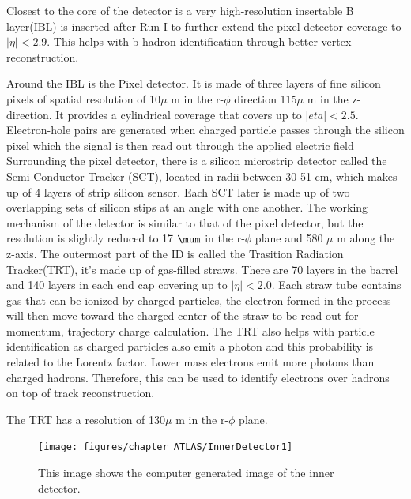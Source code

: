 Closest to the core of the detector is a very high-resolution insertable B layer(IBL) is inserted after Run I to further extend the pixel detector coverage to $|\eta|< 2.9$. This helps with b-hadron identification through better vertex reconstruction.

Around the IBL is the Pixel detector. It is made of three layers of fine silicon pixels of spatial resolution of 10$\mu$ m in the r-$\phi$ direction 115$\mu$ m in the z-direction. It provides a cylindrical coverage that covers up to $|eta|<2.5$. Electron-hole pairs are generated when charged particle passes through the silicon pixel which the signal is then read out through the applied electric field
Surrounding the pixel detector, there is a silicon microstrip detector called the Semi-Conductor Tracker (SCT), located in radii between 30-51 cm, which makes up of 4 layers of strip silicon sensor. Each SCT later is made up of two overlapping sets of silicon stips at an angle with one another. The working mechanism of the detector is similar to that of the pixel detector, but the resolution is slightly reduced to 17 $\mum$ in the r-$\phi$ plane and 580 $\mu$ m along the z-axis. 
The outermost part of the ID is called the Trasition Radiation Tracker(TRT), it's made up of gas-filled straws. There are 70 layers in the barrel and 140 layers in each end cap covering up to $|\eta|<2.0$. Each straw tube contains gas that can be ionized by charged particles, the electron formed in the process will then move toward the charged center of the straw to be read out for momentum, trajectory charge calculation. The TRT also helps with particle identification as charged particles also
emit a photon and this probability is related to the Lorentz factor. Lower mass electrons emit more photons than charged hadrons. Therefore, this can be used to identify electrons over hadrons on top of track reconstruction. 

The TRT has a resolution of 130$\mu$ m in the r-$\phi$ plane.

\begin{figure}[!htb]
    \begin{center}
        \texttt{[image: figures/chapter\_ATLAS/InnerDetector1]}
        \caption{
		    This image shows the computer generated image of the inner detector. \cite{Pequenao:1095926} 
        }
        \label{fig:InnerDetector}
    \end{center}
\end{figure}

